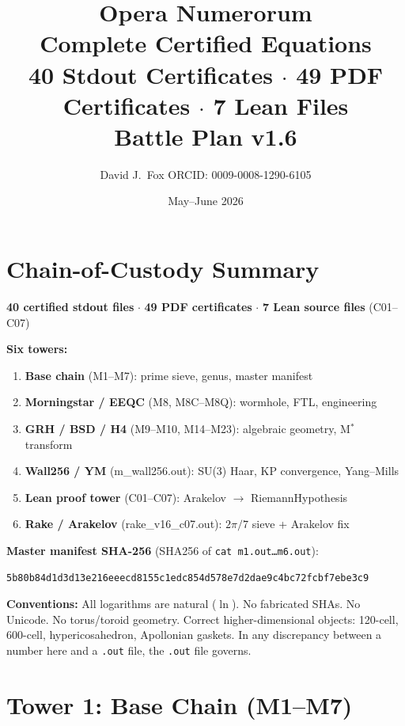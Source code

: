 \documentclass[12pt,letterpaper]{article}
\title{\textbf{Opera Numerorum}\\
  Complete Certified Equations\\
  40 Stdout Certificates $\cdot$ 49 PDF Certificates $\cdot$ 7 Lean Files\\
  Battle Plan v1.6}
\author{David J.\ Fox \quad ORCID: 0009-0008-1290-6105}
\date{May--June 2026}
\begin{document}
\maketitle
\tableofcontents
\newpage

\section*{Chain-of-Custody Summary}

\textbf{40 certified stdout files} $\cdot$
\textbf{49 PDF certificates} $\cdot$
\textbf{7 Lean source files} (C01--C07)

\textbf{Six towers:}
\begin{enumerate}
  \item \textbf{Base chain} (M1--M7): prime sieve, genus, master manifest
  \item \textbf{Morningstar / EEQC} (M8, M8C--M8Q): wormhole, FTL, engineering
  \item \textbf{GRH / BSD / H4} (M9--M10, M14--M23): algebraic geometry, M$^*$ transform
  \item \textbf{Wall256 / YM} (m\_wall256.out): SU(3) Haar, KP convergence, Yang--Mills
  \item \textbf{Lean proof tower} (C01--C07): Arakelov $\to$ RiemannHypothesis
  \item \textbf{Rake / Arakelov} (rake\_v16\_c07.out): $2\pi/7$ sieve + Arakelov fix
\end{enumerate}

\textbf{Master manifest SHA-256} (SHA256 of \texttt{cat m1.out\ldots m6.out}):
\begin{verbatim}
5b80b84d1d3d13e216eeecd8155c1edc854d578e7d2dae9c4bc72fcbf7ebe3c9
\end{verbatim}

\textbf{Conventions:} All logarithms are natural ($\ln$).
No fabricated SHAs. No Unicode. No torus/toroid geometry.
Correct higher-dimensional objects: 120-cell, 600-cell, hypericosahedron,
Apollonian gaskets.
In any discrepancy between a number here and a \texttt{.out} file,
the \texttt{.out} file governs.

\newpage

\section{Tower 1: Base Chain (M1--M7)}
\end{document}
